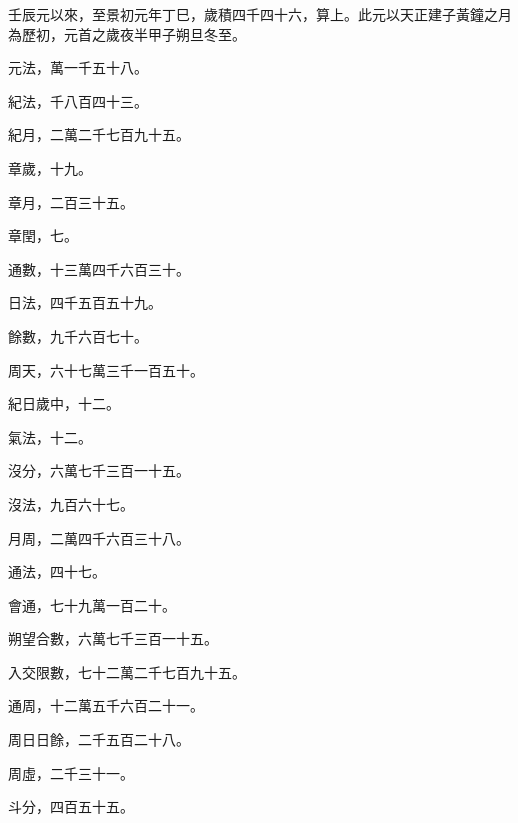 \begin{pinyinscope}
 壬辰元以來，至景初元年丁巳，歲積四千四十六，算上。此元以天正建子黃鐘之月為歷初，元首之歲夜半甲子朔旦冬至。



 元法，萬一千五十八。



 紀法，千八百四十三。



 紀月，二萬二千七百九十五。



 章歲，十九。



 章月，二百三十五。



 章閏，七。



 通數，十三萬四千六百三十。



 日法，四千五百五十九。



 餘數，九千六百七十。



 周天，六十七萬三千一百五十。



 紀日歲中，十二。



 氣法，十二。



 沒分，六萬七千三百一十五。



 沒法，九百六十七。



 月周，二萬四千六百三十八。



 通法，四十七。



 會通，七十九萬一百二十。



 朔望合數，六萬七千三百一十五。



 入交限數，七十二萬二千七百九十五。



 通周，十二萬五千六百二十一。



 周日日餘，二千五百二十八。



 周虛，二千三十一。



 斗分，四百五十五。




\end{pinyinscope}
